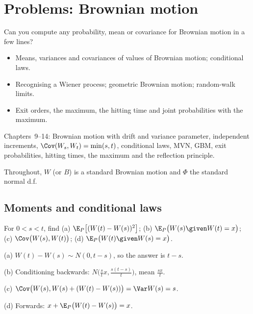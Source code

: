 \chapter{Problems: Brownian motion}
\label{ch:prob-bm}

\begin{question}
Can you compute any probability, mean or covariance for Brownian motion in a few lines?
\end{question}

\begin{whatfor}
\begin{itemize}
  \item Means, variances and covariances of values of Brownian motion; conditional laws.
  \item Recognising a Wiener process; geometric Brownian motion; random-walk limits.
  \item Exit orders, the maximum, the hitting time and joint probabilities with the maximum.
\end{itemize}
\end{whatfor}

\begin{prereq}
Chapters~9--14: Brownian motion with drift and variance parameter, independent increments, $\Cov(W_s,W_t)=\min(s,t)$, conditional laws, MVN, GBM, exit probabilities, hitting times, the maximum and the reflection principle.
\end{prereq}

Throughout, $W$ (or $B$) is a standard Brownian motion and $\Phi$ the standard normal d.f.

\section{Moments and conditional laws}

\begin{problem}
For $0<s<t$, find (a) $\E_P\big[(W(t)-W(s))^2\big]$; (b) $\E_P\big(W(s)\given W(t)=x\big)$; (c) $\Cov\big(W(s),W(t)\big)$; (d) $\E_P\big(W(t)\given W(s)=x\big)$.
\begin{steps}
  \item (a) $W(t)-W(s)\sim N(0,t-s)$, so the answer is $t-s$.
  \item (b) Conditioning backwards: $N\big(\frac stx,\frac{s(t-s)}t\big)$, mean $\frac{sx}{t}$.
  \item (c) $\Cov\big(W(s),W(s)+(W(t)-W(s))\big)=\Var W(s)=s$.
  \item (d) Forwards: $x+\E_P\big(W(t)-W(s)\big)=x$.
\end{steps}
\end{problem}

